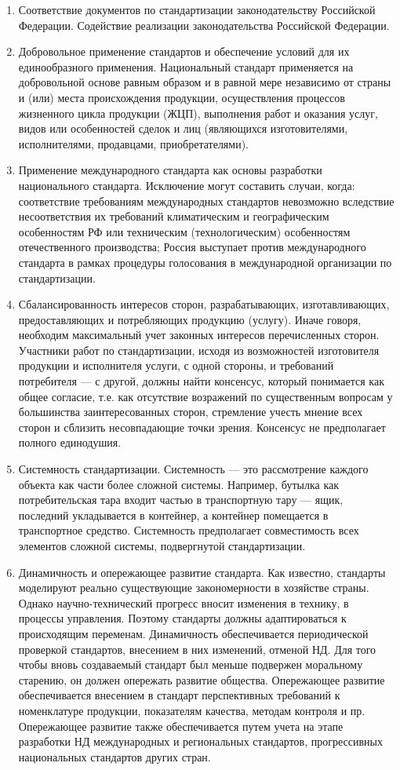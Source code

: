 \begin{enumerate}
\item Соответствие документов по стандартизации законодательству Российской Федерации. Содействие реализации законодательства Российской Федерации.
\item Добровольное применение стандартов и обеспечение условий для их единообразного применения. Национальный стандарт применяется на добровольной основе равным образом и в равной мере независимо от страны и (или) места происхождения продукции, осуществления процессов жизненного цикла продукции (ЖЦП), выполнения работ и оказания услуг, видов или особенностей сделок и лиц (являющихся изготовителями, исполнителями, продавцами, приобретателями).
\item Применение международного стандарта как основы разработки национального стандарта. Исключение могут составить случаи, когда: соответствие требованиям международных стандартов невозможно вследствие несоответствия их требований климатическим и географическим особенностям РФ или техническим (технологическим) особенностям отечественного производства; Россия выступает против международного стандарта в рамках процедуры голосования в международной организации по стандартизации.
\item Сбалансированность интересов сторон, разрабатывающих, изготавливающих, предоставляющих и потребляющих продукцию (услугу). Иначе говоря, необходим максимальный учет законных интересов перечисленных сторон. Участники работ по стандартизации, исходя из возможностей изготовителя продукции и исполнителя услуги, с одной стороны, и требований потребителя — с другой, должны найти консенсус, который понимается как общее согласие, т.е. как отсутствие возражений по существенным вопросам у большинства заинтересованных сторон, стремление учесть мнение всех сторон и сблизить несовпадающие точки зрения. Консенсус не предполагает полного единодушия.
\item Системность стандартизации. Системность — это рассмотрение каждого объекта как части более сложной системы. Например, бутылка как потребительская тара входит частью в транспортную тару — ящик, последний укладывается в контейнер, а контейнер помещается в транспортное средство. Системность предполагает совместимость всех элементов сложной системы,  подвергнутой стандартизации.
\item Динамичность и опережающее развитие стандарта. Как известно, стандарты моделируют реально существующие закономерности в хозяйстве страны. Однако научно-технический прогресс вносит изменения в технику, в процессы управления. Поэтому стандарты должны адаптироваться к происходящим переменам. Динамичность обеспечивается периодической проверкой стандартов, внесением в них изменений, отменой НД. Для того чтобы вновь создаваемый стандарт был меньше подвержен моральному старению, он должен опережать развитие общества. Опережающее развитие обеспечивается внесением в стандарт перспективных требований к номенклатуре продукции, показателям качества, методам контроля и пр. Опережающее развитие также обеспечивается путем учета на этапе разработки НД международных и региональных стандартов, прогрессивных национальных стандартов других стран.

\end{enumerate}
